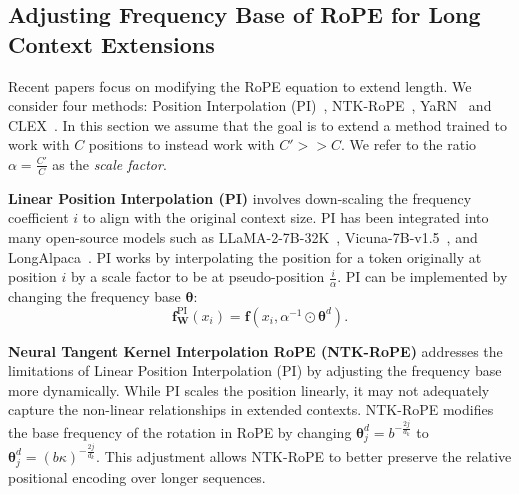 \documentclass{article}
\begin{document}



\subsection{Adjusting Frequency Base of RoPE for Long Context Extensions}

Recent papers focus on modifying the RoPE equation to extend length. We consider four methods: Position Interpolation (PI)~\citep{chen2023extending}, NTK-RoPE~\citep{emozillareddit}, YaRN~\citep{peng2023yarn} and CLEX~\citep{chen2024clexcontinuouslengthextrapolation}. In this section we assume that the goal is to extend a method trained to work with $C$ positions to instead work with $C' >> C$. We refer to the ratio $\alpha = \frac{C'}{C}$ as the \textit{scale factor}.

\textbf{Linear Position Interpolation (PI)} involves down-scaling the frequency coefficient $i$ to align with the original context size. PI has been integrated into many open-source models such as LLaMA-2-7B-32K~\citep{together-instruct}, Vicuna-7B-v1.5~\citep{vicuna2023}, and LongAlpaca~\citep{chen2023longlora}. PI works by interpolating the position for a token originally at position $i$ by a scale factor to be at pseudo-position $\frac{i}{\alpha}$.
 PI can be implemented by changing the frequency base $\bm{\theta}$:
\begin{equation}
\mathbf{f}_\mathbf{W}^{\text{PI}}(x_i) = \mathbf{f}(x_i, \alpha^{-1} \odot \bm{\theta}^d).
\end{equation}


\textbf{Neural Tangent Kernel Interpolation RoPE (NTK-RoPE) } addresses the limitations of Linear Position Interpolation (PI) by adjusting the frequency base more dynamically. While PI scales the position linearly, it may not adequately capture the non-linear relationships in extended contexts. NTK-RoPE modifies the base frequency of the rotation in RoPE by changing $\bm{\theta}^d_j = b^{-\frac{2j}{d_k}}$ to $\bm{\theta}^d_j = (b\kappa)^{-\frac{2j}{d_k}}$. This adjustment allows NTK-RoPE to better preserve the relative positional encoding over longer sequences.
\end{document}
